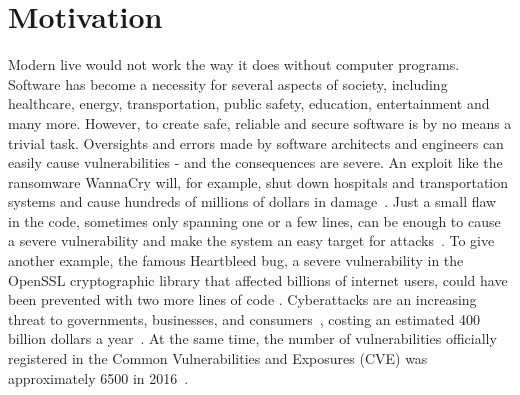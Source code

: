 \documentclass[
	a4paper,
	pagesize,
	pdftex,
	12pt,
	twoside, %
	BCOR=5mm, %
	ngerman,
	fleqn,
	final,
	]{scrartcl}
\begin{document}
\section{Motivation}\label{Motivation}
Modern live would not work the way it does without computer programs. Software has become a necessity for several aspects of society, including healthcare, energy, transportation, public safety, education, entertainment and many more. However, to create safe, reliable and secure software is by no means a trivial task. Oversights and errors made by software architects and engineers can easily cause vulnerabilities - and the consequences are severe. An exploit like the ransomware WannaCry will, for example, shut down hospitals and transportation systems and cause hundreds of millions of dollars in damage~\cite{DanGoodin.2017}. Just a small flaw in the code, sometimes only spanning one or a few lines, can be enough to cause a severe vulnerability and make the system an easy target for attacks~\citep{Yamaguchi.2012}. To give another example, the famous Heartbleed bug, a severe vulnerability in the OpenSSL cryptographic library that affected billions of internet users, could have been prevented with two more lines of code \citep{Durumeric.2014}. Cyberattacks are an increasing threat to governments, businesses, and consumers~\cite{Dam.2017}, costing an estimated 400 billion dollars a year~\cite{Losses.2014}. At the same time, the number of vulnerabilities officially registered in the Common Vulnerabilities and Exposures (CVE) was approximately 6500 in 2016~\cite{CVE}. %
\newline
\end{document}
